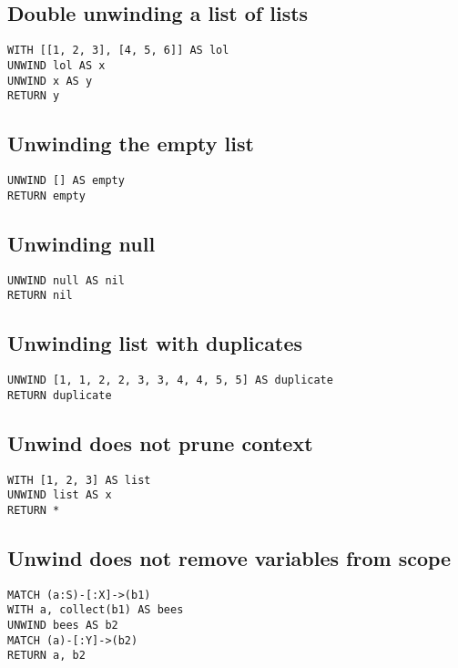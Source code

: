\subsection{Double unwinding a list of lists}

\begin{lstlisting}
WITH [[1, 2, 3], [4, 5, 6]] AS lol
UNWIND lol AS x
UNWIND x AS y
RETURN y
\end{lstlisting}

\subsection{Unwinding the empty list}

\begin{lstlisting}
UNWIND [] AS empty
RETURN empty
\end{lstlisting}

\subsection{Unwinding null}

\begin{lstlisting}
UNWIND null AS nil
RETURN nil
\end{lstlisting}

\subsection{Unwinding list with duplicates}

\begin{lstlisting}
UNWIND [1, 1, 2, 2, 3, 3, 4, 4, 5, 5] AS duplicate
RETURN duplicate
\end{lstlisting}

\subsection{Unwind does not prune context}

\begin{lstlisting}
WITH [1, 2, 3] AS list
UNWIND list AS x
RETURN *
\end{lstlisting}

\subsection{Unwind does not remove variables from scope}

\begin{lstlisting}
MATCH (a:S)-[:X]->(b1)
WITH a, collect(b1) AS bees
UNWIND bees AS b2
MATCH (a)-[:Y]->(b2)
RETURN a, b2
\end{lstlisting}

